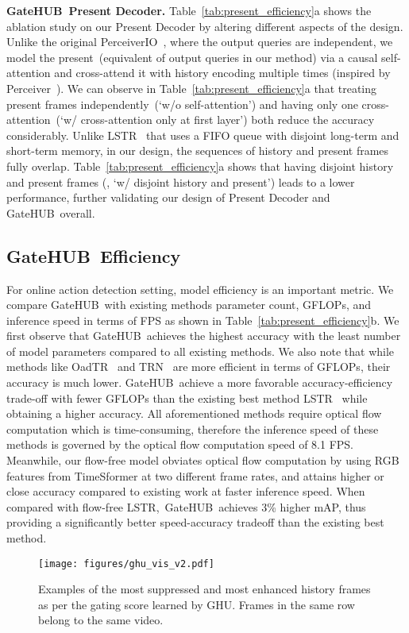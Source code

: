 \documentclass[10pt,twocolumn,letterpaper]{article}
\newcommand{\methodname}{GateHUB}
\begin{document}
{\noindent \bf \methodname~Present Decoder.} Table~\ref{tab:present_efficiency}a shows the ablation study on our Present Decoder by altering different aspects of the design. Unlike the original PerceiverIO~\cite{jaegle2021perceiverio}, where the output queries are independent, we model the present~(equivalent of output queries in our method) via a causal self-attention and cross-attend it with history encoding multiple times (inspired by Perceiver~\cite{jaegle2021perceiver}). We can observe in Table~\ref{tab:present_efficiency}a that treating present frames independently~(`\ie w/o self-attention') and having only one cross-attention~(`\ie w/ cross-attention only at first layer') both reduce the accuracy considerably. Unlike LSTR~\cite{xu2021long} that uses a FIFO queue with disjoint long-term and short-term memory, in our design, the sequences of history and present frames fully overlap. Table~\ref{tab:present_efficiency}a shows that having disjoint history and present frames (\ie, `w/ disjoint history and present') leads to a  lower performance, further validating our design of Present Decoder and \methodname~overall.

\subsection{\methodname~Efficiency}
For online action detection setting, model efficiency is an important metric.
We compare \methodname~with existing methods \wrt parameter count, GFLOPs, and inference speed in terms of FPS as shown in Table~\ref{tab:present_efficiency}b. We first observe that \methodname~achieves the highest accuracy with the least number of model parameters compared to all existing methods. We also note that while methods like OadTR~\cite{wang2021oadtr} and TRN~\cite{xu2019temporal} are more efficient in terms of GFLOPs, their accuracy is much lower. \methodname~achieve a more favorable accuracy-efficiency trade-off with fewer GFLOPs than the existing best method LSTR~\cite{xu2021long} while obtaining a higher accuracy. All aforementioned methods require optical flow computation which is time-consuming, therefore the inference speed of these methods is governed by the optical flow computation speed of 8.1 FPS.
Meanwhile, our flow-free model obviates optical flow computation by using RGB features from TimeSformer at two different frame rates, and attains higher or close accuracy compared to existing work at  faster inference speed. 
When compared with flow-free LSTR,~\methodname~achieves 3\% higher mAP, thus providing a significantly better speed-accuracy tradeoff than the existing best method.
\begin{figure}[h]
\begin{center}
    \texttt{[image: figures/ghu\_vis\_v2.pdf]}
\end{center}
\vspace{-2em}
  \caption{Examples of the most suppressed and most enhanced history frames as per the gating score learned by GHU. Frames in the same row belong to the same video. 
}
\label{fig:ghu_vis}
\vspace{-1em}
\end{figure}
\end{document}
